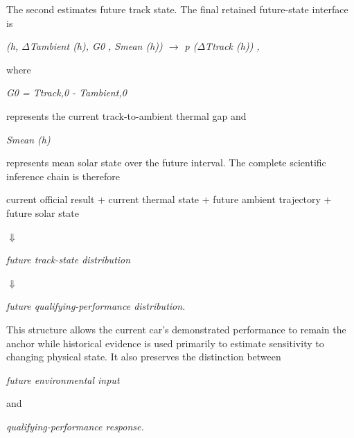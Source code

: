 The second estimates future track state. The final retained future-state interface is

\begin{center}\textit{(h, \ensuremath{\Delta}Tambient (h), G0 , Smean (h)) \ensuremath{\rightarrow} p (\ensuremath{\Delta}Ttrack (h)) ,}\end{center}

where

\begin{center}\textit{G0 = Ttrack,0 - Tambient,0}\end{center}

represents the current track-to-ambient thermal gap and

\begin{center}\textit{Smean (h)}\end{center}

represents mean solar state over the future interval. The complete scientific inference chain is therefore

current official result + current thermal state + future ambient trajectory + future solar state

\begin{center}\textit{\ensuremath{\Downarrow}}\end{center}

\begin{center}\textit{future track-state distribution}\end{center}

\begin{center}\textit{\ensuremath{\Downarrow}}\end{center}

\begin{center}\textit{future qualifying-performance distribution.}\end{center}

This structure allows the current car's demonstrated performance to remain the anchor while historical evidence is used primarily to estimate sensitivity to changing physical state. It also preserves the distinction between

\begin{center}\textit{future environmental input}\end{center}

and

\begin{center}\textit{qualifying-performance response.}\end{center}

